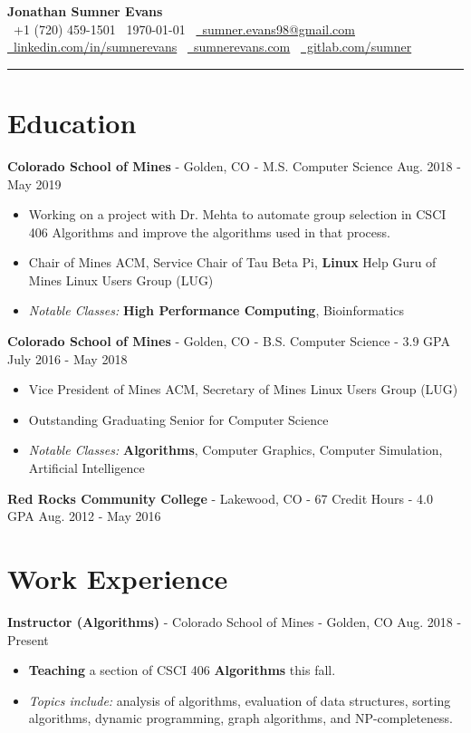 \documentclass[10pt,letterpaper]{article}
\begin{document}
\begin{center}
    {\huge\textbf{Jonathan Sumner Evans}} \\
    \vspace{3pt}
    \faPhone\ +1 (720) 459-1501
    \textbar\ \today
    \textbar\ \href{mailto:sumner.evans98@gmail.com}{\faEnvelope\ sumner.evans98@gmail.com} \\
    \href{https://www.linkedin.com/in/sumnerevans}{\faLinkedin\ linkedin.com/in/sumnerevans}
    \textbar\ \href{https://sumnerevans.com}{\faGlobe\ sumnerevans.com}
    \textbar\ \href{https://gitlab.com/sumner}{\faGitlab\ gitlab.com/sumner}
    \rule{\textwidth}{0.5pt}
\end{center}

\section*{Education}
\textbf{Colorado School of Mines} - Golden, CO - M.S. Computer Science
\hfill Aug. 2018 - May 2019
\begin{itemize}
    \item Working on a project with Dr. Mehta to automate group selection in
        CSCI 406 Algorithms and improve the algorithms used in that process.
    \item Chair of Mines ACM, Service Chair of Tau Beta Pi, \textbf{Linux} Help
        Guru of Mines Linux Users Group (LUG)
    \item \textit{Notable Classes:} \textbf{High Performance Computing},
        Bioinformatics
\end{itemize}

\textbf{Colorado School of Mines} - Golden, CO - B.S. Computer Science - 3.9 GPA
\hfill July 2016 - May 2018
\begin{itemize}
    \item Vice President of Mines ACM, Secretary of Mines Linux Users Group
        (LUG)
    \item Outstanding Graduating Senior for Computer Science
    \item \textit{Notable Classes:} \textbf{Algorithms}, Computer Graphics,
        Computer Simulation, Artificial Intelligence
\end{itemize}

\vspace{2pt}
\textbf{Red Rocks Community College} - Lakewood, CO - 67 Credit Hours - 4.0 GPA
\hfill Aug. 2012 - May 2016

\section*{Work Experience}
\textbf{Instructor (Algorithms)} - Colorado School of Mines - Golden, CO
\hfill Aug. 2018 - Present
\begin{itemize}
    \item \textbf{Teaching} a section of CSCI 406 \textbf{Algorithms} this fall.
    \item \textit{Topics include:} analysis of algorithms, evaluation of data
        structures, sorting algorithms, dynamic programming, graph algorithms,
        and NP-completeness.
\end{itemize}
\end{document}

